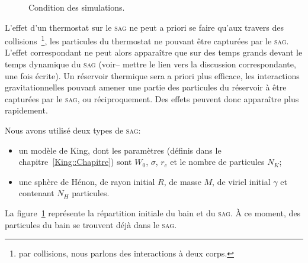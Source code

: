 	\begin{figure}[hbt]
		\begin{center}
			\caption{Condition des simulations.\label{Fig::CI::Repr}}
		\end{center}
	\end{figure}

	L'effet d'un thermostat sur le \textsc{sag} ne peut a priori se faire qu'aux travers des collisions~\footnote{par collisions, nous parlons des
	interactions à deux corps.}, les particules du thermostat ne pouvant être capturées par le \textsc{sag}. L'effet correspondant ne peut alors
	apparaître que sur des temps grands devant le temps dynamique du \textsc{sag} (voir-- mettre le lien vers la discussion correspondante, une
	fois écrite). Un réservoir thermique sera a priori plus efficace, les interactions gravitationnelles pouvant amener une partie des particules
	du réservoir à être capturées par le \textsc{sag}, ou réciproquement. Des effets peuvent donc apparaître plus rapidement.

	Nous avons utilisé deux types de \textsc{sag}:
	\begin{itemize}
		\item un modèle de King, dont les paramètres (définis dans le chapitre~\ref{King::Chapitre}) sont $W_0$, $\sigma$, $r_c$ et le nombre
			de particules $N_K$;
		\item une sphère de Hénon, de rayon initial $R$, de masse $M$, de viriel initial $\gamma$ et contenant $N_H$ particules.
	\end{itemize}

	La figure~\ref{Fig::CI::Repr} représente la répartition initiale du bain et du \textsc{sag}. À ce moment, des particules du bain se trouvent déjà dans le \textsc{sag}.


